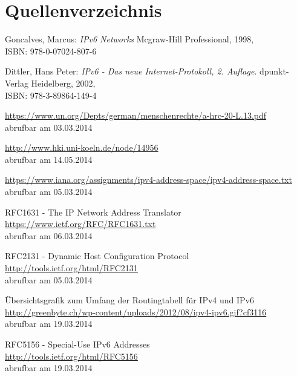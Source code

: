 \documentclass[a4paper,12pt]{scrartcl}
\begin{document}
\section{Quellenverzeichnis}
\label{sec:6}
\renewcommand\refname{Quellenverzeichnis}
\begin{thebibliography}{999}

Goncalves, Marcus:   {\sl IPv6 Networks} Mcgraw-Hill Professional, 1998,
\\ISBN:  978-0-07024-807-6

Dittler, Hans Peter:  {\sl IPv6 - Das neue Internet-Protokoll, 2. Auflage}. dpunkt-Verlag Heidelberg, 2002,
\\ISBN: 978-3-89864-149-4



\url{https://www.un.org/Depts/german/menschenrechte/a-hrc-20-L.13.pdf}\\
abrufbar am 03.03.2014

\url{http://www.hki.uni-koeln.de/node/14956}\\
abrufbar am 14.05.2014

 \url{https://www.iana.org/assignments/ipv4-address-space/ipv4-address-space.txt}\\
abrufbar am 05.03.2014

 RFC1631 - The IP Network Address Translator\\
\url{https://www.ietf.org/RFC/RFC1631.txt}\\
abrufbar am 06.03.2014

 RFC2131 - Dynamic Host Configuration Protocol\\
\url{http://tools.ietf.org/html/RFC2131}\\
abrufbar am 05.03.2014

 \"Ubersichtsgrafik zum Umfang der Routingtabell f\"ur IPv4 und IPv6\\
\url{http://greenbyte.ch/wp-content/uploads/2012/08/ipv4-ipv6.gif?cf3116}\\
abrufbar am 19.03.2014

 RFC5156 - Special-Use IPv6 Addresses \\
\url{http://tools.ietf.org/html/RFC5156}\\
abrufbar am 19.03.2014


\end{thebibliography}
\end{document}
